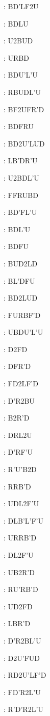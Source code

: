 \documentclass[9pt]{article}
\begin{document}
{\begin{multicols}{6}
: BD'LF2U

: BDLU

: U2BUD

: URBD

: BDU'L'U

: RBUDL'U

: BF2UFR'D

: BDFRU

: BD2U'LUD

: LB'DR'U

: U2BDL'U

: FFRUBD

: BD'FL'U

: BDL'U

: BDFU

: BUD2LD

: BL'DFU

: BD2LUD

: FURBF'D

: UBDU'L'U

: D2FD

: DFR'D

: FD2LF'D

: D'R2BU

: B2R'D

: DRL2U

: D'RF'U

: R'U'B2D

: RRB'D

: UDL2F'U

: DLB'L'F'U

: URRB'D

: DL2F'U

: UB2R'D

: RU'RB'D

: UD2FD

: LBR'D

: D'R2BL'U

: D2U'FUD

: RD2U'LF'D

: FD'R2L'U

: R'D'R2L'U


\end{multicols}}
\end{document}
